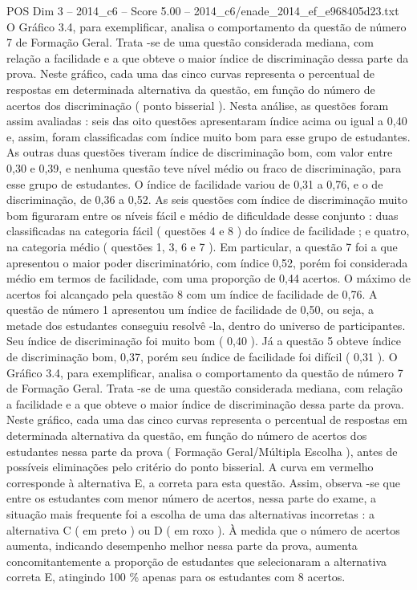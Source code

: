 \begin{textsample}{POS Dim 3 – 2014\_c6 – Score 5.00 – 2014\_c6/enade\_2014\_ef\_e968405d23.txt}
O Gráfico 3.4, para exemplificar, analisa o comportamento da questão de número 7 de Formação Geral.
Trata -se de uma questão considerada mediana, com relação a facilidade e a que obteve o maior índice de discriminação dessa parte da prova.
Neste gráfico, cada uma das cinco curvas representa o percentual de respostas em determinada alternativa da questão, em função do número de acertos dos discriminação ( ponto bisserial ).
Nesta análise, as questões foram assim avaliadas : seis das oito questões apresentaram índice acima ou igual a 0,40 e, assim, foram classificadas com índice muito bom para esse grupo de estudantes.
As outras duas questões tiveram índice de discriminação bom, com valor entre 0,30 e 0,39, e nenhuma questão teve nível médio ou fraco de discriminação, para esse grupo de estudantes.
O índice de facilidade variou de 0,31 a 0,76, e o de discriminação, de 0,36 a 0,52.
As seis questões com índice de discriminação muito bom figuraram entre os níveis fácil e médio de dificuldade desse conjunto : duas classificadas na categoria fácil ( questões 4 e 8 ) do índice de facilidade ; e quatro, na categoria médio ( questões 1, 3, 6 e 7 ).
Em particular, a questão 7 foi a que apresentou o maior poder discriminatório, com índice 0,52, porém foi considerada médio em termos de facilidade, com uma proporção de 0,44 acertos.
O máximo de acertos foi alcançado pela questão 8 com um índice de facilidade de 0,76.
A questão de número 1 apresentou um índice de facilidade de 0,50, ou seja, a metade dos estudantes conseguiu resolvê -la, dentro do universo de participantes.
Seu índice de discriminação foi muito bom ( 0,40 ).
Já a questão 5 obteve índice de discriminação bom, 0,37, porém seu índice de facilidade foi difícil ( 0,31 ).
O Gráfico 3.4, para exemplificar, analisa o comportamento da questão de número 7 de Formação Geral.
Trata -se de uma questão considerada mediana, com relação a facilidade e a que obteve o maior índice de discriminação dessa parte da prova.
Neste gráfico, cada uma das cinco curvas representa o percentual de respostas em determinada alternativa da questão, em função do número de acertos dos estudantes nessa parte da prova ( Formação Geral/Múltipla Escolha ), antes de possíveis eliminações pelo critério do ponto bisserial.
A curva em vermelho corresponde à alternativa E, a correta para esta questão.
Assim, observa -se que entre os estudantes com menor número de acertos, nessa parte do exame, a situação mais frequente foi a escolha de uma das alternativas incorretas : a alternativa C ( em preto ) ou D ( em roxo ).
À medida que o número de acertos aumenta, indicando desempenho melhor nessa parte da prova, aumenta concomitantemente a proporção de estudantes que selecionaram a alternativa correta E, atingindo 100 \% apenas para os estudantes com 8 acertos.

\end{textsample}
